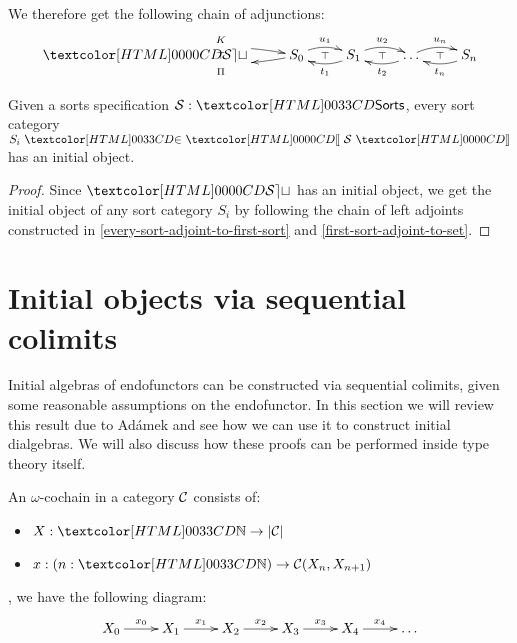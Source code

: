 We therefore get the following chain of adjunctions:
$$
\xymatrix{
\SET \ar@/^/[r]^{K}
\ar@{}[r]|{\top} 
&S_0 \ar@/^/[l]^{\Pi} \ar@/^/[r]^{u_1} 
\ar@{}[r]|{\top} 
&S_1 \ar@/^/[l]^{t_1} \ar@/^/[r]^{u_2} 
\ar@{}[r]|{\top} 
&\hdots \ar@/^/[l]^{t_2} \ar@/^/[r]^{u_n} 
\ar@{}[r]|{\top} 
&S_n \ar@/^/[l]^{t_n}
}
$$

\begin{theorem}
  \label{initial-obj-sorts}

  Given a sorts specification $\Ss : \sortsty$, every sort category
  $\sortsin{S_i}{\SortCat{\Ss}}$ has an initial object.
\end{theorem}

\begin{proof}
  Since $\SET$ has an initial object, we get the initial object of any
  sort category $S_i$ by following the chain of left adjoints
  constructed in \cref{every-sort-adjoint-to-first-sort} and
  \cref{first-sort-adjoint-to-set}.
\end{proof}

\section{Initial objects via sequential colimits}
\label{sequential-colimits}

Initial algebras of endofunctors can be constructed via sequential
colimits, given some reasonable assumptions on the endofunctor. In
this section we will review this result due to Ad\'amek
\cite{Adamek1979} and see how we can use it to construct initial
dialgebras. We will also discuss how these proofs can be performed
inside type theory itself.

\begin{definition}
  An $\omega$-cochain in a category $\mathcal{C}$ consists of:
  \begin{itemize}
  \item $X : \natty \to | \Cc |$
  \item $x : (n : \natty) \to \Cc(X_n , X_{n+1})$
  \end{itemize}
  \ie, we have the following diagram:
  $$
  \xymatrix{
    X_0 \ar[r]^{x_0}
    &X_1 \ar[r]^{x_1}
    &X_2 \ar[r]^{x_2}
    &X_3 \ar[r]^{x_3}
    &X_4 \ar[r]^{x_4}
    &\hdots
  }
  $$
\end{definition}

